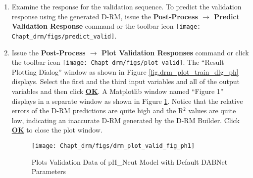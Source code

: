 \begin{enumerate}
	\item Examine the response for the validation sequence.  To predict the validation response using the generated D-RM, issue the \textbf{Post-Process $\rightarrow$ Predict Validation Response} command or the toolbar icon \texttt{[image: Chapt\_drm/figs/predict\_valid]}.
	\item Issue the \textbf{Post-Process $\rightarrow$ Plot Validation Responses} command or click the toolbar icon \texttt{[image: Chapt\_drm/figs/plot\_valid]}.  The ``Result Plotting Dialog'' window as shown in Figure \ref{fig.drm_plot_train_dlg_ph} displays.  Select the first and the third input variables and all of the output variables and then click \textbf{\underline{OK}}.  A Matplotlib window named ``Figure 1'' displays in a separate window as shown in Figure \ref{fig.drm_plot_valid_fig_ph1}.  Notice that the relative errors of the D-RM predictions are quite high and the R$^2$ values are quite low, indicating an inaccurate D-RM generated by the D-RM Builder.  Click \textbf{\underline{OK}} to close the plot window.
	\begin{figure}[H]
		\begin{center}
			\texttt{[image: Chapt\_drm/figs/drm\_plot\_valid\_fig\_ph1]}
			\caption{Plots Validation Data of pH\_Neut Model with Default DABNet Parameters}
			\label{fig.drm_plot_valid_fig_ph1}
		\end{center}
	\end{figure}

\end{enumerate}
